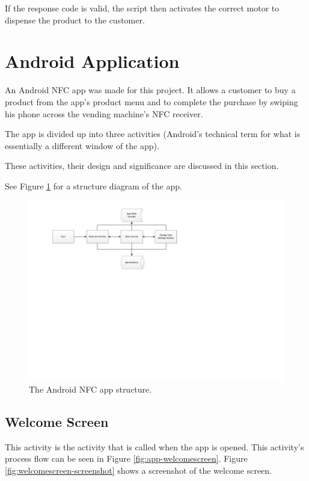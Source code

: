 If the response code is valid, the script then activates the correct motor to
dispense the product to the customer.

\section{Android Application}
\label{sec:nfc-android-app}

An Android NFC app was made for this project. It allows a customer to buy a
product from the app's product menu and to complete the purchase by swiping
his phone across the vending machine's NFC receiver.

The app is divided up into three activities (Android's technical term for what
is essentially a different window of the app). 

These activities, their design and significance are discussed in this section.

See Figure \ref{fig:nfc_app_structure} for a structure
diagram of the app.

\begin{figure}
 \centering 
 \includegraphics[clip = true, trim = 0 360 0 20,
 scale=0.7]{app_structure}
 \caption{The Android NFC app structure.}
 \label{fig:nfc_app_structure}
\end{figure}

\subsection{Welcome Screen}

This activity is the activity that is called when the app is opened. This
activity's process flow can be seen in Figure \ref{fig:app-welcomescreen}.
Figure \ref{fig:welcomescreen-screenshot} shows a screenshot of the welcome
screen.

